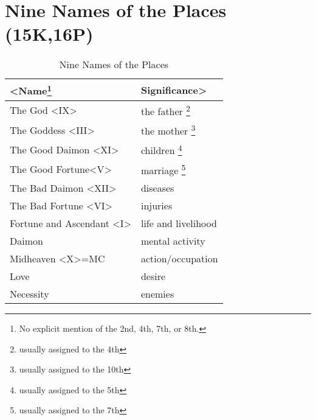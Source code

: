 \section{Nine Names of the Places (15K,16P)}

\begin{table}[ht]
\begin{center}
\caption{Nine Names of the Places}
\label{Table 2.1}
\vspace{0.5cm}
\begin{tabular}{ll}
\hline
\textbf{<Name}\footnote{No explicit mention of the 2nd, 4th, 7th, or 8th.}
			& \textbf{Significance>}	\\
\hline
The God <IX> 			& the father
						\footnote{usually assigned to the 4th}		\\
The Goddess <III>		& the mother
						\footnote{usually assigned to the 10th}	\\
The Good Daimon <XI>	& children
						\footnote{usually assigned to the 5th}		\\
The Good Fortune<V>	& marriage
						\footnote{usually assigned to the 7th}		\\
The Bad Daimon <XII>	& diseases			\\
The Bad Fortune <VI>	& injuries			\\
\parbox{4.5cm}{
Fortune and Ascendant 
<I>}						& life and livelihood	\\
Daimon							& mental activity		\\
Midheaven <X>=MC		& action/occupation		\\
Love							& desire					\\
Necessity						& enemies					\\
\hline
\end{tabular}
\end{center}
\end{table}

\newpage